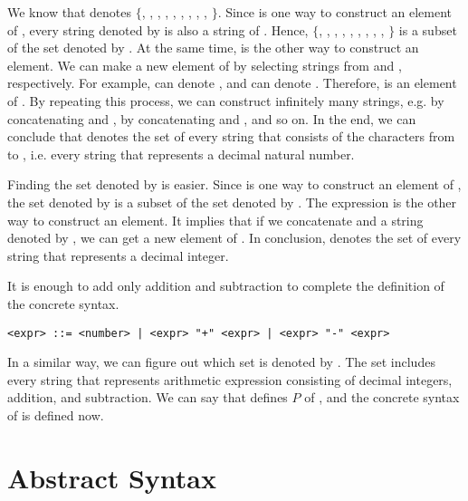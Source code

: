 We know that  denotes
$\{$, , , , ,
, , , , $\}$.
Since  is one way to construct an element of , every
string denoted by  is also a string of . Hence,
$\{$, , , , ,
, , , , $\}$
is a subset of the set denoted by . At the same time, 
 is the other way to construct an element. We can make a new element
of  by selecting strings from  and ,
respectively. For example,  can denote , and
 can denote . Therefore,  is an element of
. By repeating this process, we can construct infinitely many
strings, e.g.  by concatenating  and ,
 by concatenating  and , and so on. In the
end, we can conclude that  denotes the set of every string that
consists of the characters from  to , i.e. every string that
represents a decimal natural number.

Finding the set denoted by  is easier. Since  is one
way to construct an element of , the set denoted by 
is a subset of the set denoted by . The expression   is
the other way to construct an element. It implies that if we concatenate
 and a string denoted by , we can get a new element of
. In conclusion,  denotes the set of every string
that represents a decimal integer.

It is enough to add only addition and subtraction to complete the definition of
the concrete syntax.

\begin{verbatim}
<expr> ::= <number> | <expr> "+" <expr> | <expr> "-" <expr>
\end{verbatim}

In a similar way, we can figure out which set is denoted by . The
set includes every string that represents arithmetic expression consisting of
decimal integers, addition, and subtraction. We can say that 
defines $P$ of \lang, and the concrete syntax of \lang is defined now.

\section{Abstract Syntax}

